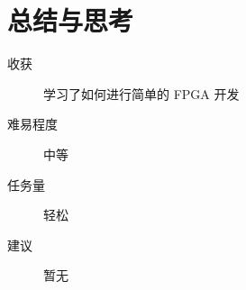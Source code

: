 \documentclass[UTF8,fontset=fandol]{ctexart}
\begin{document}
\section*{总结与思考}
\begin{description}
    \item[收获] 学习了如何进行简单的 FPGA 开发
    \item[难易程度] 中等
    \item[任务量] 轻松
    \item[建议] 暂无
\end{description}
\end{document}
